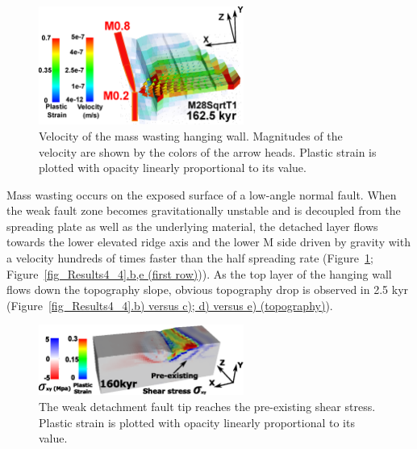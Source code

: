 \begin{figure}[h]
  \centering
    \includegraphics[width=0.6\textwidth]{./Figures/fig_Results_3_2_5_Cut-back_velocity.eps}
  \caption[Velocity of the mass wasting hanging wall.]{Velocity of the mass wasting hanging wall. Magnitudes of the velocity are shown by the colors of the arrow heads. Plastic strain is plotted with opacity linearly proportional to its value.}
 \label{fig_Results_3_2_5_Cut-back_velocity}
\end{figure}   

Mass wasting occurs on the exposed surface of a low-angle normal fault. When the weak fault zone becomes gravitationally unstable and is decoupled from the spreading plate as well as the underlying material, the detached layer flows towards the lower elevated ridge axis and the lower M side driven by gravity with a velocity hundreds of times faster than the half spreading rate (Figure~\hyperref[fig_Results_3_2_5_Cut-back_velocity]{\ref{fig_Results_3_2_5_Cut-back_velocity}}; Figure~\hyperref[fig_Results4_4]{\ref{fig_Results4_4}.b,e (first row)})). As the top layer of the hanging wall flows down the topography slope, obvious topography drop is observed in 2.5 kyr (Figure~\hyperref[fig_Results4_4]{\ref{fig_Results4_4}.b) versus c); d) versus e) (topography)}).

\begin{figure}[h]
  \centering
    \includegraphics[width=0.6\textwidth]{./Figures/fig_Results4_5_sqrt_cut_back_pre_accummulated_shear_zone.eps}
  \caption[The weak detachment fault tip reaches the pre-existing shear stress.]{The weak detachment fault tip reaches the pre-existing shear stress. Plastic strain is plotted with opacity linearly proportional to its value.}
 \label{fig_Results4_5}
\end{figure}   

